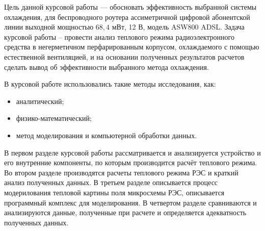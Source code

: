 Цель данной курсовой работы — обосновать эффективность выбранной
системы охлаждения, для беспроводного роутера ассиметричной цифровой
абонентской линии выходной мощностью
$68,4$ мВт, 12 В, модель ASW800 ADSL.
Задача курсовой работы – провести анализ теплового режима
радиоэлектронного средства в негерметичном перфарированным корпусом,
охлаждаемого с помощью естественной вентиляцией, и на основании
полученных результатов расчетов сделать вывод об эффективности
выбранного метода охлаждения.

В курсовой работе использовались такие методы исследования, как:
\begin{itemize}[nosep]
\item аналитический;
\item физико-математический;
\item метод моделирования и компьютерной обработки данных.  
\end{itemize}

В первом разделе курсовой работы рассматривается и анализируется
устройство и его внутренние компоненты, по которым производится
расчёт теплового режима. Во втором разделе производятся расчеты
теплового режима РЭС и краткий анализ полученных данных.
В третьем разделе описывается процесс модерилования тепловой
картины поля микросхемы РЭС, описывается программный комплекс для моделирования.
В четвертом разделе сравниваются и анализируются данные, полученные при расчете
и определяется адекватность полученных данных.

\newpage
